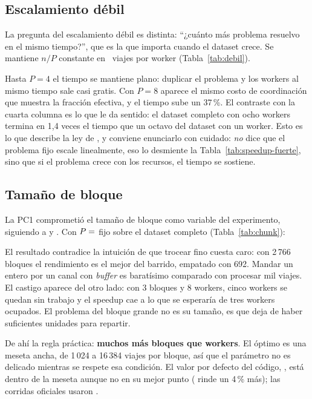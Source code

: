 \subsection{Escalamiento débil}\label{sec:debil}

La pregunta del escalamiento débil es distinta: \enquote{¿cuánto más problema resuelvo en el mismo
tiempo?}, que es la que importa cuando el dataset crece. Se mantiene $n / P$ constante en
~viajes por worker (Tabla~\ref{tab:debil}).



Hasta $P = 4$ el tiempo se mantiene plano: duplicar el problema y los workers al mismo tiempo sale
casi gratis. Con $P = 8$ aparece el mismo costo de coordinación que muestra la fracción efectiva, y
el tiempo sube un 37\,\%. El contraste con la cuarta columna es lo que le da sentido: el dataset
completo con ocho workers termina en 1,4 veces el tiempo que un octavo del dataset con un worker.
Esto es lo que describe la ley de \textcite{gustafson1988}, y conviene enunciarlo con cuidado:
\emph{no} dice que el problema fijo escale linealmente, eso lo desmiente la Tabla~\ref{tab:speedup-fuerte},
sino que si el problema crece con los recursos, el tiempo se sostiene.

\subsection{Tamaño de bloque}\label{sec:chunk}

La PC1 comprometió el tamaño de bloque como variable del experimento, siguiendo a
\textcite{kwedlo2021} y \textcite{kwedlo2024}. Con $P = \cifra{p-chunk}$ fijo sobre el dataset
completo (Tabla~\ref{tab:chunk}):



El resultado contradice la intuición de que trocear fino cuesta caro: con 2\,766 bloques el
rendimiento es el mejor del barrido, empatado con 692. Mandar un entero por un canal con
\emph{buffer} es baratísimo comparado con procesar mil viajes. El castigo aparece del otro lado: con
3 bloques y 8 workers, cinco workers se quedan sin trabajo y el speedup cae a lo que se esperaría de
tres workers ocupados. El problema del bloque grande no es su tamaño, es que deja de haber
suficientes unidades para repartir.

De ahí la regla práctica: \textbf{muchos más bloques que workers}. El óptimo es una meseta ancha,
de 1\,024 a 16\,384 viajes por bloque, así que el parámetro no es delicado mientras se respete esa
condición. El valor por defecto del código, , está dentro de la meseta aunque no en su
mejor punto ( rinde un 4\,\% más); las corridas oficiales usaron .

